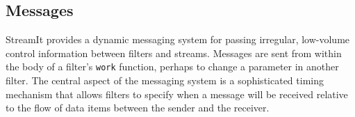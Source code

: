 \subsection{Messages}

StreamIt provides a dynamic messaging system for passing irregular,
low-volume control information between filters and streams.  Messages
are sent from within the body of a filter's {\tt work} function,
perhaps to change a parameter in another filter.  The central aspect
of the messaging system is a sophisticated timing mechanism that
allows filters to specify when a message will be received relative to
the flow of data items between the sender and the receiver.